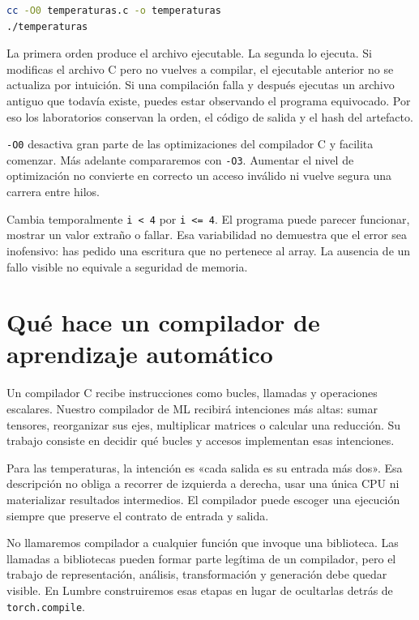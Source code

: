 \documentclass[12pt,a4paper,oneside]{report}
\begin{document}
\begin{lstlisting}[language=bash]
cc -O0 temperaturas.c -o temperaturas
./temperaturas
\end{lstlisting}
La primera orden produce el archivo ejecutable. La segunda lo ejecuta. Si modificas el archivo C pero no vuelves a compilar, el ejecutable anterior no se actualiza por intuición. Si una compilación falla y después ejecutas un archivo antiguo que todavía existe, puedes estar observando el programa equivocado. Por eso los laboratorios conservan la orden, el código de salida y el hash del artefacto.

\texttt{-O0} desactiva gran parte de las optimizaciones del compilador C y facilita comenzar. Más adelante compararemos con \texttt{-O3}. Aumentar el nivel de optimización no convierte en correcto un acceso inválido ni vuelve segura una carrera entre hilos.

\begin{cuidado}
Cambia temporalmente \texttt{i < 4} por \texttt{i <= 4}. El programa puede parecer funcionar, mostrar un valor extraño o fallar. Esa variabilidad no demuestra que el error sea inofensivo: has pedido una escritura que no pertenece al array. La ausencia de un fallo visible no equivale a seguridad de memoria.

\end{cuidado}
\section{Qué hace un compilador de aprendizaje automático}
Un compilador C recibe instrucciones como bucles, llamadas y operaciones escalares. Nuestro compilador de ML recibirá intenciones más altas: sumar tensores, reorganizar sus ejes, multiplicar matrices o calcular una reducción. Su trabajo consiste en decidir qué bucles y accesos implementan esas intenciones.

Para las temperaturas, la intención es «cada salida es su entrada más dos». Esa descripción no obliga a recorrer de izquierda a derecha, usar una única CPU ni materializar resultados intermedios. El compilador puede escoger una ejecución siempre que preserve el contrato de entrada y salida.

\begin{center}
\end{center}
No llamaremos compilador a cualquier función que invoque una biblioteca. Las llamadas a bibliotecas pueden formar parte legítima de un compilador, pero el trabajo de representación, análisis, transformación y generación debe quedar visible. En Lumbre construiremos esas etapas en lugar de ocultarlas detrás de \texttt{torch.compile}.
\end{document}
